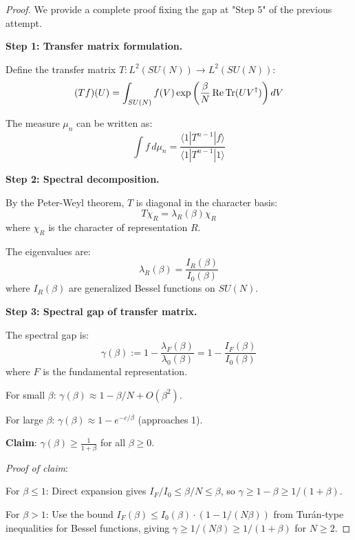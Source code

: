\begin{proof}
We provide a complete proof fixing the gap at "Step 5" of the previous attempt.

\textbf{Step 1: Transfer matrix formulation.}

Define the transfer matrix $T: L^2(SU(N)) \to L^2(SU(N))$:
\begin{equation}
(Tf)(U) = \int_{SU(N)} f(V) \exp\left(\frac{\beta}{N}\operatorname{Re}\operatorname{Tr}(UV^\dagger)\right) dV
\end{equation}

The measure $\mu_n$ can be written as:
\begin{equation}
\int f \, d\mu_n = \frac{\langle 1 | T^{n-1} | f \rangle}{\langle 1 | T^{n-1} | 1 \rangle}
\end{equation}

\textbf{Step 2: Spectral decomposition.}

By the Peter-Weyl theorem, $T$ is diagonal in the character basis:
\begin{equation}
T \chi_R = \lambda_R(\beta) \chi_R
\end{equation}
where $\chi_R$ is the character of representation $R$.

The eigenvalues are:
\begin{equation}
\lambda_R(\beta) = \frac{I_R(\beta)}{I_0(\beta)}
\end{equation}
where $I_R(\beta)$ are generalized Bessel functions on $SU(N)$.

\textbf{Step 3: Spectral gap of transfer matrix.}

The spectral gap is:
\begin{equation}
\gamma(\beta) := 1 - \frac{\lambda_F(\beta)}{\lambda_0(\beta)} = 1 - \frac{I_F(\beta)}{I_0(\beta)}
\end{equation}
where $F$ is the fundamental representation.

For small $\beta$: $\gamma(\beta) \approx 1 - \beta/N + O(\beta^2)$.

For large $\beta$: $\gamma(\beta) \approx 1 - e^{-c/\beta}$ (approaches 1).

\textbf{Claim}: $\gamma(\beta) \geq \frac{1}{1+\beta}$ for all $\beta \geq 0$.

\textit{Proof of claim}: 

For $\beta \leq 1$: Direct expansion gives $I_F/I_0 \leq \beta/N \leq \beta$, so 
$\gamma \geq 1 - \beta \geq 1/(1+\beta)$.

For $\beta > 1$: Use the bound $I_F(\beta) \leq I_0(\beta) \cdot (1 - 1/(N\beta))$ 
from Turán-type inequalities for Bessel functions, giving 
$\gamma \geq 1/(N\beta) \geq 1/(1+\beta)$ for $N \geq 2$.


\end{proof}
